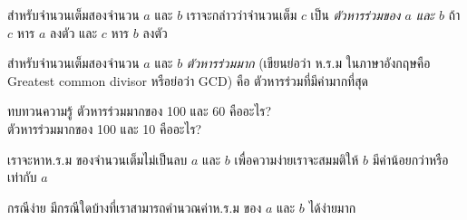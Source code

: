 สำหรับ{\wbr}จำนวนเต็ม{\wbr}สอง{\wbr}จำนวน $a$ และ $b$ เรา{\wbr}จะ{\wbr}กล่าว{\wbr}ว่า{\wbr}จำนวนเต็ม $c$ เป็น {\em
ตัวหาร{\wbr}ร่วม{\wbr}ของ $a$ และ $b$} ถ้า $c$ หาร $a$ ลงตัว และ $c$ หาร $b$ ลงตัว{\wbr}

สำหรับ{\wbr}จำนวนเต็ม{\wbr}สอง{\wbr}จำนวน $a$ และ $b$ {\em ตัวหารร่วมมาก} (เขียน{\wbr}ย่อ{\wbr}ว่า ห.{\wbr}ร.{\wbr}ม
ใน{\wbr}ภาษาอังกฤษ{\wbr}คือ Greatest common divisor หรือ{\wbr}ย่อ{\wbr}ว่า GCD)  คือ{\wbr}
ตัวหาร{\wbr}ร่วม{\wbr}ที่{\wbr}มี{\wbr}ค่า{\wbr}มาก{\wbr}ที่สุด{\wbr}

\begin{quiz}{ทบทวน{\wbr}ความ{\wbr}รู้}
ตัวหารร่วมมาก{\wbr}ของ 100 และ 60 คือ{\wbr}อะไร? \\
ตัวหารร่วมมาก{\wbr}ของ 100 และ 10 คือ{\wbr}อะไร?
\end{quiz}

เรา{\wbr}จะ{\wbr}หา{\wbr}ห.{\wbr}ร.{\wbr}ม ของ{\wbr}จำนวนเต็ม{\wbr}ไม่{\wbr}เป็น{\wbr}ลบ $a$ และ $b$ เพื่อ{\wbr}ความ{\wbr}ง่าย{\wbr}เรา{\wbr}จะ{\wbr}สมมติ{\wbr}ให้ $b$
มี{\wbr}ค่า{\wbr}น้อย{\wbr}กว่า{\wbr}หรือ{\wbr}เท่า{\wbr}กับ $a$

\begin{quiz}{กรณี{\wbr}ง่าย}
มี{\wbr}กรณี{\wbr}ใด{\wbr}บ้าง{\wbr}ที่{\wbr}เรา{\wbr}สามารถ{\wbr}คำนวณ{\wbr}ค่า{\wbr}ห.{\wbr}ร.{\wbr}ม ของ $a$ และ $b$ ได้{\wbr}ง่าย{\wbr}มาก{\wbr}
\end{quiz}





